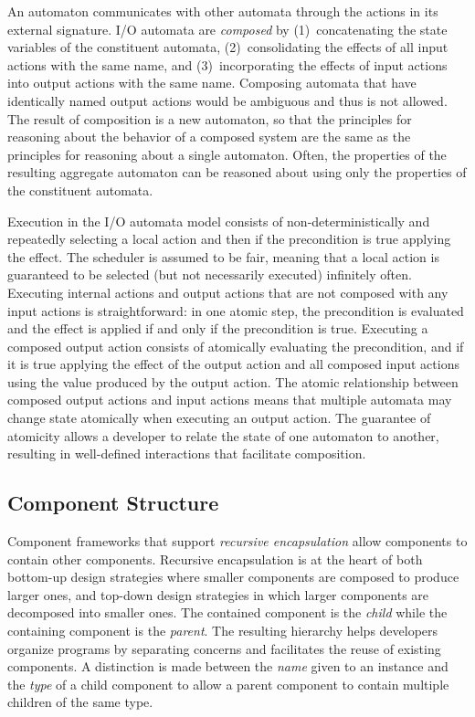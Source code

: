 An automaton communicates with other automata through the actions in its external signature.
I/O automata are \emph{composed} by (1)~concatenating the state variables of the constituent automata, (2)~consolidating the effects of all input actions with the same name, and (3)~incorporating the effects of input actions into output actions with the same name.
Composing automata that have identically named output actions would be ambiguous and thus is not allowed.
The result of composition is a new automaton, so that the principles for reasoning about the behavior of a composed system are the same as the principles for reasoning about a single automaton.
Often, the properties of the resulting aggregate automaton can be reasoned about using only the properties of the constituent automata.

Execution in the I/O automata model consists of non-deterministically and repeatedly selecting a local action and then if the precondition is true applying the effect.
The scheduler is assumed to be fair, meaning that a local action is guaranteed to be selected (but not necessarily executed) infinitely often.
Executing internal actions and output actions that are not composed with any input actions is straightforward: in one atomic step, the precondition is evaluated and the effect is applied if and only if the precondition is true.
Executing a composed output action consists of atomically evaluating the precondition, and if it is true applying the effect of the output action and all composed input actions using the value produced by the output action.
The atomic relationship between composed output actions and input actions means that multiple automata may change state atomically when executing an output action.
The guarantee of atomicity allows a developer to relate the state of one automaton to another, resulting in well-defined interactions that facilitate composition.

\subsection{Component Structure\label{component_structure}}

Component frameworks that support \emph{recursive encapsulation} allow components to contain other components.
Recursive encapsulation is at the heart of both bottom-up design strategies where smaller components are composed to produce larger ones, and top-down design strategies in which larger components are decomposed into smaller ones.
The contained component is the \emph{child} while the containing component is the \emph{parent}.
The resulting hierarchy helps developers organize programs by separating concerns and facilitates the reuse of existing components.
A distinction is made between the \emph{name} given to an instance and the \emph{type} of a child component to allow a parent component to contain multiple children of the same type.

